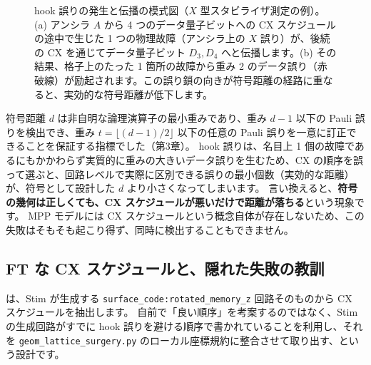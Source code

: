 \begin{figure}[htbp]
\begin{minipage}{0.43\linewidth}
  \end{minipage}
  \caption{hook 誤りの発生と伝播の模式図（$X$ 型スタビライザ測定の例）。(a) アンシラ $A$ から 4 つのデータ量子ビットへの CX スケジュールの途中で生じた 1 つの物理故障（アンシラ上の $X$ 誤り）が、後続の CX を通じてデータ量子ビット $D_3, D_4$ へと伝播します。(b) その結果、格子上のたった 1 箇所の故障から重み 2 のデータ誤り（赤破線）が励起されます。この誤り鎖の向きが符号距離の経路に重なると、実効的な符号距離が低下します。}
  \label{fig:ch14_hook_error}
\end{figure}


符号距離 $d$ は非自明な論理演算子の最小重みであり、重み $d-1$ 以下の Pauli 誤りを検出でき、重み $t = \lfloor (d-1)/2 \rfloor$ 以下の任意の Pauli 誤りを一意に訂正できることを保証する指標でした（第3章）。
hook 誤りは、名目上 1 個の故障であるにもかかわらず実質的に重みの大きいデータ誤りを生むため、CX の順序を誤って選ぶと、回路レベルで実際に区別できる誤りの最小個数（実効的な距離）が、符号として設計した $d$ より小さくなってしまいます。
言い換えると、\textbf{符号の幾何は正しくても、CX スケジュールが悪いだけで距離が落ちる}という現象です。
MPP モデルには CX スケジュールという概念自体が存在しないため、この失敗はそもそも起こり得ず、同時に検出することもできません。

\subsection{FT な CX スケジュールと、隠れた失敗の教訓}

 は、Stim が生成する \texttt{surface\_code:rotated\_memory\_z} 回路そのものから CX スケジュールを抽出します。
自前で「良い順序」を考案するのではなく、Stim の生成回路がすでに hook 誤りを避ける順序で書かれていることを利用し、それを \texttt{geom\_lattice\_surgery.py} のローカル座標規約に整合させて取り出す、という設計です。

